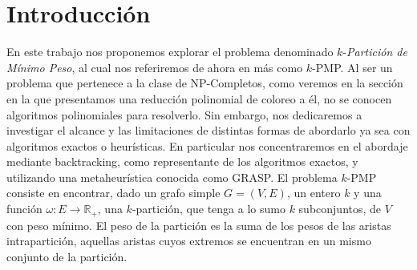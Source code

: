 \section{Introducción}

En este trabajo nos proponemos explorar el problema denominado $k$-\textit{Partición de Mínimo Peso}, al
cual nos referiremos de ahora en más como $k$-PMP. Al ser un problema que pertenece a la clase
de NP-Completos, como veremos en la sección en la que presentamos una reducción polinomial de 
coloreo a él, no se conocen algoritmos polinomiales para resolverlo. Sin embargo, nos dedicaremos
a investigar el alcance y las limitaciones de distintas formas de abordarlo ya sea con algoritmos
exactos o heurísticas. En particular nos concentraremos en el abordaje mediante backtracking, 
como representante de los algoritmos exactos, y utilizando una metaheurística conocida como GRASP.
El problema $k$-PMP consiste en encontrar, dado un grafo simple $G = (V, E)$, un entero $k$ y una
función $\omega : E \rightarrow \mathbb{R}_+$, una $k$-partición, que tenga a lo sumo $k$ subconjuntos,
de $V$ con peso mínimo. El peso de la partición es la suma de los pesos de las aristas intrapartición,
aquellas aristas cuyos extremos se encuentran en un mismo conjunto de la partición.
